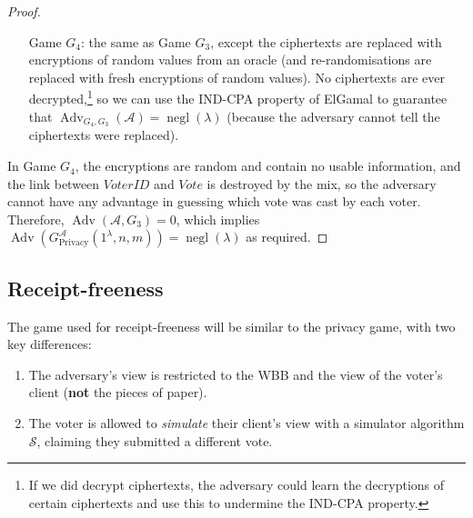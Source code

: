 \documentclass[12pt,a4paper]{article}
\DeclareMathOperator{\negl}{\text{negl}}
\DeclareMathOperator{\Adv}{\text{Adv}}
\theoremstyle{definition}
\newcommand{\Vote}{\mathit{Vote}}
\newcommand{\VoterID}{\mathit{VoterID}}
\begin{document}
\begin{proof}
\begin{itemize}[leftmargin=4em]
        \item[Game] $G_4$: the same as Game $G_3$, except the ciphertexts are replaced with encryptions of random values from an oracle (and re-randomisations are replaced with fresh encryptions of random values). No ciphertexts are ever decrypted,\footnote{If we did decrypt ciphertexts, the adversary could learn the decryptions of certain ciphertexts and use this to undermine the IND-CPA property.} so we can use the IND-CPA property of ElGamal to guarantee that $\Adv_{G_4,G_3}(\mathcal{A})=\negl(\lambda)$ (because the adversary cannot tell the ciphertexts were replaced).
    \end{itemize}
    In Game $G_4$, the encryptions are random and contain no usable information, and the link between $\VoterID$ and $\Vote$ is destroyed by the mix, so the adversary cannot have any advantage in guessing which vote was cast by each voter. Therefore, $\Adv(\mathcal{A}, G_3)=0$, which implies $\Adv\left(G^\mathcal{A}_{\text{Privacy}}(1^\lambda, n, m)\right)=\negl(\lambda)$ as required.
\end{proof}
\subsection{Receipt-freeness}
The game used for receipt-freeness will be similar to the privacy game, with two key differences:
\begin{enumerate}
    \item The adversary's view is restricted to the WBB and the view of the voter's client (\textbf{not} the pieces of paper).
    \item The voter is allowed to \textit{simulate} their client's view with a simulator algorithm $\mathcal{S}$, claiming they submitted a different vote.
\end{enumerate}
\end{document}

